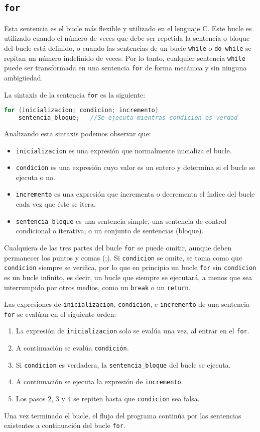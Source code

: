 \subsection{\texttt{for}}{
Esta sentencia es el bucle más flexible y utilizado en el lenguaje C. Este bucle es utilizado cuando el número de veces que debe ser repetida la sentencia o bloque del bucle está definido, o cuando las sentencias de un bucle \texttt{while} o \texttt{do while} se repitan un número indefinido de veces. Por lo tanto, cualquier sentencia \texttt{while} puede ser transformada en una sentencia \texttt{for} de forma mecánica y sin ninguna ambigüedad.

La sintaxis de la sentencia \texttt{for} es la siguiente:
\begin{lstlisting}[language=C]
for (inicializacion; condicion; incremento)
    sentencia_bloque;	//Se ejecuta mientras condicion es verdad
\end{lstlisting}
Analizando esta sintaxis podemos observar que:
\begin{itemize}
	\item \texttt{inicializacion} es una expresión que normalmente inicializa el bucle.
	\item \texttt{condicion} es una expresión cuyo valor es un entero y determina si el bucle se ejecuta o no.
	\item \texttt{incremento} es una expresión que incrementa o decrementa el índice del bucle cada vez que éste se itera.
	\item \texttt{sentencia\_bloque} es una sentencia simple, una sentencia de control condicional o iterativa, o un conjunto de sentencias (bloque).
\end{itemize}
Cualquiera de las tres partes del bucle \texttt{for} se puede omitir, aunque deben permanecer los puntos y comas (;). Si \texttt{condicion} se omite, se toma como que \texttt{condicion} siempre se verifica, por lo que en principio un bucle \texttt{for} sin \texttt{condicion} es un bucle infinito, es decir, un bucle que siempre se ejecutará, a menos que sea interrumpido por otros medios, como un \texttt{break} o un \texttt{return}.

Las expresiones de \texttt{inicializacion}, \texttt{condicion}, e \texttt{incremento} de una sentencia \texttt{for} se evalúan en el siguiente orden:
\begin{enumerate}
	\item La expresión de \texttt{inicializacion} solo se evalúa una vez, al entrar en el \texttt{for}.
	\item A continuación se evalúa \texttt{condición}.
	\item Si \texttt{condicion} es verdadera, la \texttt{sentencia\_bloque} del bucle se ejecuta.
	\item A continuación se ejecuta la expresión de \texttt{incremento}.
	\item Los pasos 2, 3 y 4 se repiten hasta que \texttt{condicion} sea falsa.
\end{enumerate}
Una vez terminado el bucle, el flujo del programa continúa por las sentencias existentes a continuación del bucle \texttt{for}.

}
